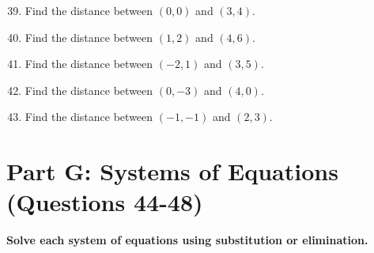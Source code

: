 \documentclass[12pt]{article}
\begin{document}
\begin{enumerate}
\setcounter{enumi}{38}

\item Find the distance between $(0, 0)$ and $(3, 4)$.

\vspace{1.2cm}

\item Find the distance between $(1, 2)$ and $(4, 6)$.

\vspace{1.2cm}

\item Find the distance between $(-2, 1)$ and $(3, 5)$.

\vspace{1.2cm}

\item Find the distance between $(0, -3)$ and $(4, 0)$.

\vspace{1.2cm}

\item Find the distance between $(-1, -1)$ and $(2, 3)$.

\vspace{1.2cm}

\end{enumerate}

\section*{Part G: Systems of Equations (Questions 44-48)}

\noindent\textbf{Solve each system of equations using substitution or elimination.}
\end{document}
